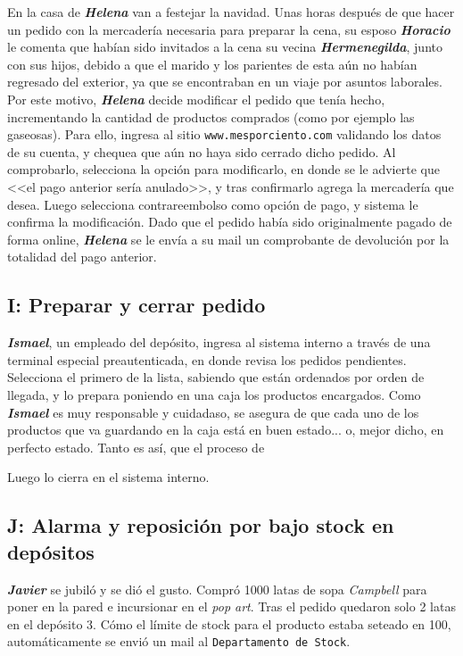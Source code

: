 En la casa de \textbf{\emph{Helena}} van a festejar la navidad. Unas horas
después de que hacer un pedido con la mercadería necesaria para preparar la
cena, su esposo \textbf{\emph{Horacio}} le comenta que habían sido invitados a
la cena su vecina \textbf{\emph{Hermenegilda}}, junto con sus hijos, debido a
que el marido y los parientes de esta aún no habían regresado del exterior, ya
que se encontraban en un viaje por asuntos laborales. Por este motivo,
\textbf{\emph{Helena}} decide modificar el pedido que tenía hecho,
incrementando la cantidad de productos comprados (como por ejemplo las
gaseosas). Para ello, ingresa al sitio \texttt{www.mesporciento.com} validando
los datos de su cuenta, y chequea que aún no haya sido cerrado dicho pedido.
Al comprobarlo, selecciona la opción para modificarlo, en donde se le advierte
que <<el pago anterior sería anulado>>, y tras confirmarlo agrega la
mercadería que desea. Luego selecciona contrareembolso como opción de pago, y
sistema le confirma la modificación. Dado que el pedido había sido
originalmente pagado de forma online, \textbf{\emph{Helena}} se le envía a su
mail un comprobante de devolución por la totalidad del pago anterior.

\subsection{I: Preparar y cerrar pedido}

\textbf{\emph{Ismael}}, un empleado del depósito, ingresa al sistema interno a
través de una terminal especial preautenticada, en donde revisa los pedidos
pendientes. Selecciona el primero de la lista, sabiendo que están ordenados
por orden de llegada, y lo prepara poniendo en una caja los productos
encargados. Como \textbf{\emph{Ismael}} es muy responsable y cuidadaso, se
asegura de que cada uno de los productos que va guardando en la caja está en
buen estado... o, mejor dicho, en perfecto estado. Tanto es así, que el
proceso de 

Luego lo cierra en el sistema interno.

\subsection{J: Alarma y reposición por bajo stock en depósitos}

\textbf{\emph{Javier}} se jubiló y se dió el gusto. Compró 1000 latas de sopa
\textit{Campbell} para poner en la pared e incursionar en el \textit{pop art}.
Tras el pedido quedaron solo 2 latas en el depósito 3. Cómo el límite de stock
para el producto estaba seteado en 100, automáticamente se envió un mail al
\texttt{Departamento de Stock}.

